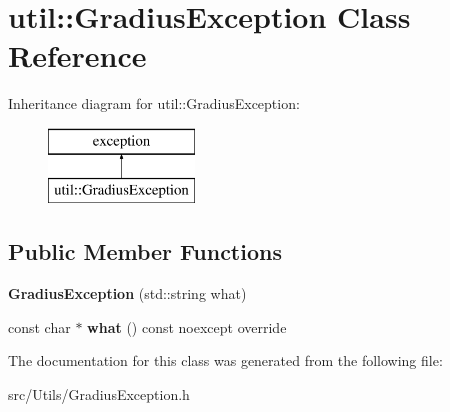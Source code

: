 \hypertarget{classutil_1_1_gradius_exception}{}\section{util\+:\+:Gradius\+Exception Class Reference}
\label{classutil_1_1_gradius_exception}
Inheritance diagram for util\+:\+:Gradius\+Exception\+:\begin{figure}[H]
\begin{center}
\leavevmode
\includegraphics[height=2.000000cm]{d3/d02/classutil_1_1_gradius_exception}
\end{center}
\end{figure}
\subsection*{Public Member Functions}
\begin{DoxyCompactItemize}
\item 
\mbox{\label{classutil_1_1_gradius_exception_afe647e6aad64320c8f9e8cf6760439db}} 
{\bfseries Gradius\+Exception} (std\+::string what)
\item 
\mbox{\label{classutil_1_1_gradius_exception_a5841d82685a36086bebfbe985d34ecb5}} 
const char $\ast$ {\bfseries what} () const noexcept override
\end{DoxyCompactItemize}


The documentation for this class was generated from the following file\+:\begin{DoxyCompactItemize}
\item 
src/\+Utils/Gradius\+Exception.\+h\end{DoxyCompactItemize}
